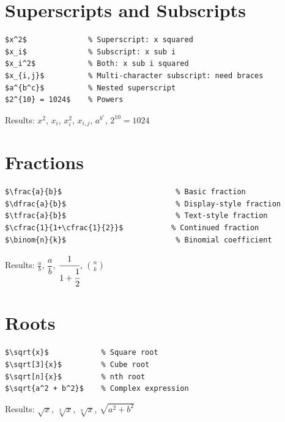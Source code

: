 \section{Superscripts and Subscripts}

\begin{lstlisting}[language={[LaTeX]TeX}, caption=Superscripts and subscripts]
$x^2$              % Superscript: x squared
$x_i$              % Subscript: x sub i
$x_i^2$            % Both: x sub i squared
$x_{i,j}$          % Multi-character subscript: need braces
$a^{b^c}$          % Nested superscript
$2^{10} = 1024$    % Powers
\end{lstlisting}

Results: $x^2$, \quad $x_i$, \quad $x_i^2$, \quad $x_{i,j}$, \quad $a^{b^c}$, \quad $2^{10} = 1024$

\section{Fractions}

\begin{lstlisting}[language={[LaTeX]TeX}, caption=Fractions]
$\frac{a}{b}$                          % Basic fraction
$\dfrac{a}{b}$                         % Display-style fraction
$\tfrac{a}{b}$                         % Text-style fraction
$\cfrac{1}{1+\cfrac{1}{2}}$           % Continued fraction
$\binom{n}{k}$                         % Binomial coefficient
\end{lstlisting}

Results: $\frac{a}{b}$, \quad $\dfrac{a}{b}$, \quad $\cfrac{1}{1+\cfrac{1}{2}}$, \quad $\binom{n}{k}$

\section{Roots}

\begin{lstlisting}[language={[LaTeX]TeX}, caption=Roots]
$\sqrt{x}$            % Square root
$\sqrt[3]{x}$         % Cube root
$\sqrt[n]{x}$         % nth root
$\sqrt{a^2 + b^2}$    % Complex expression
\end{lstlisting}

Results: $\sqrt{x}$, \quad $\sqrt[3]{x}$, \quad $\sqrt[n]{x}$, \quad $\sqrt{a^2 + b^2}$

